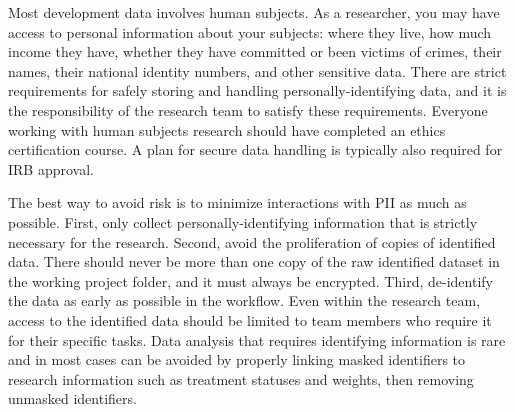 Most development data involves human subjects.
As a researcher, you may have access to personal information about your subjects:
where they live, how much income they have,
whether they have committed or been victims of crimes,
their names, their national identity numbers, and other sensitive data.
There are strict requirements for safely storing and handling personally-identifying data,
and it is the responsibility of the research team to satisfy these requirements.
Everyone working with human subjects research should
have completed an ethics certification course.
A plan for secure data handling is typically also required for IRB approval.

The best way to avoid risk is to minimize interactions with PII as much as possible.
First, only collect personally-identifying information that is strictly necessary for the research.
Second, avoid the proliferation of copies of identified data.
There should never be more than one copy of the raw identified dataset in the working project folder,
and it must always be encrypted.
Third, de-identify the data as early as possible in the workflow.
Even within the research team,
access to the identified data should be limited to team members who require it for their specific tasks.
Data analysis that requires identifying information is rare
and in most cases can be avoided by properly linking masked identifiers to research information
such as treatment statuses and weights, then removing unmasked identifiers.

